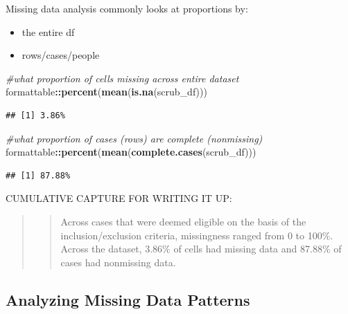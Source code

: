\documentclass[
  11pt,
]{book}
\newenvironment{Shaded}{\begin{snugshade}}{\end{snugshade}}
\newcommand{\CommentTok}[1]{\textcolor[rgb]{0.37,0.37,0.37}{\textit{#1}}}
\newcommand{\FunctionTok}[1]{\textcolor[rgb]{0.27,0.27,0.27}{\textbf{#1}}}
\newcommand{\NormalTok}[1]{#1}
\newcommand{\SpecialCharTok}[1]{\textcolor[rgb]{0.43,0.43,0.43}{\textbf{#1}}}
\providecommand{\tightlist}{%
  \setlength{\itemsep}{0pt}\setlength{\parskip}{0pt}}
\begin{document}
Missing data analysis commonly looks at proportions by:

\begin{itemize}
\tightlist
\item
  the entire df
\item
  rows/cases/people
\end{itemize}

\begin{Shaded}
\begin{Highlighting}[]
\CommentTok{\#what proportion of cells missing across entire dataset}
\NormalTok{formattable}\SpecialCharTok{::}\FunctionTok{percent}\NormalTok{(}\FunctionTok{mean}\NormalTok{(}\FunctionTok{is.na}\NormalTok{(scrub\_df)))}
\end{Highlighting}
\end{Shaded}

\begin{verbatim}
## [1] 3.86%
\end{verbatim}

\begin{Shaded}
\begin{Highlighting}[]
\CommentTok{\#what proportion of cases (rows) are complete (nonmissing)}
\NormalTok{formattable}\SpecialCharTok{::}\FunctionTok{percent}\NormalTok{(}\FunctionTok{mean}\NormalTok{(}\FunctionTok{complete.cases}\NormalTok{(scrub\_df)))}
\end{Highlighting}
\end{Shaded}

\begin{verbatim}
## [1] 87.88%
\end{verbatim}

CUMULATIVE CAPTURE FOR WRITING IT UP:

\begin{quote}
\begin{quote}
Across cases that were deemed eligible on the basis of the inclusion/exclusion criteria, missingness ranged from 0 to 100\%. Across the dataset, 3.86\% of cells had missing data and 87.88\% of cases had nonmissing data.
\end{quote}
\end{quote}

\hypertarget{analyzing-missing-data-patterns}{%
\subsection{Analyzing Missing Data Patterns}\label{analyzing-missing-data-patterns}}
\end{document}
